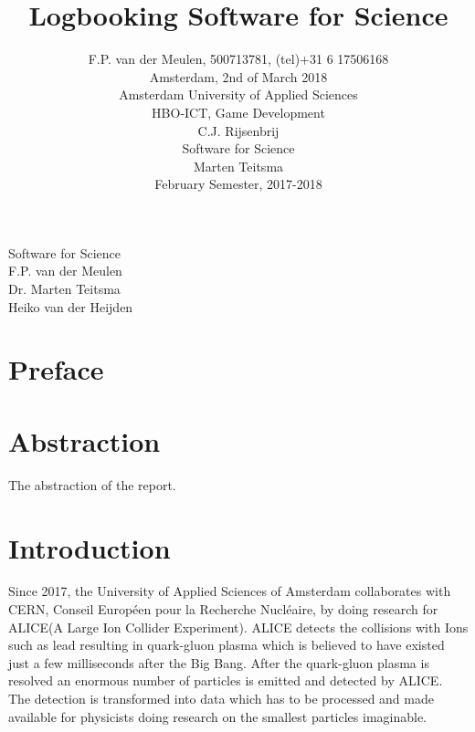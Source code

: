 \documentclass[paper=a4, fontsize=11pt,twoside]{scrartcl}	%
\title{Logbooking Software for Science}
\author{
		F.P. van der Meulen, 500713781, (tel)+31 6 17506168\\
		Amsterdam, 2nd of March 2018\\	
		Amsterdam University of Applied Sciences\\
		HBO-ICT, Game Development\\
		C.J. Rijsenbrij\\	
		Software for Science\\
		Marten Teitsma\\
		February Semester, 2017-2018\\
}
\makeatletter
\def\printtitle{%
    {\centering \@title\par}}
\def\printauthor{%
    {\centering \large \@author}}
\makeatother
\begin{document}
\thispagestyle{empty}		%


\printtitle
Software for Science\\
F.P. van der Meulen \\
Dr. Marten Teitsma\\
Heiko van der Heijden

\newpage 
\printtitle
\printauthor

\newpage

\section{Preface}

\newpage
\tableofcontents

\newpage


\section{Abstraction}
The abstraction of the report.
\newpage
\section{Introduction}
Since 2017, the University of Applied Sciences of Amsterdam collaborates with CERN, Conseil Européen pour la Recherche Nucléaire, by doing research for ALICE(A Large Ion Collider Experiment). ALICE detects the collisions with Ions such as lead resulting in quark-gluon plasma which is believed to have existed just a few milliseconds after the Big Bang. After the quark-gluon plasma is resolved an enormous number of particles is emitted and detected by ALICE. The  detection  is  transformed  into  data  which  has  to  be  processed  and  made available for physicists doing research on the smallest particles imaginable.  
\end{document}
